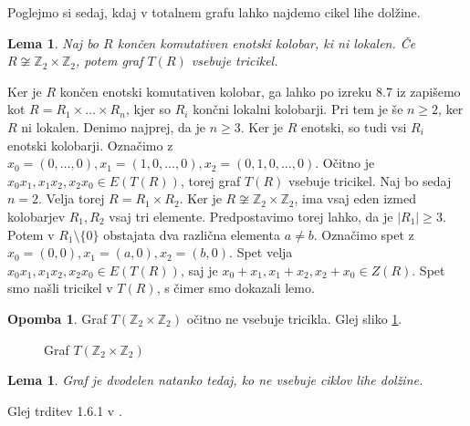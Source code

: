 \documentclass[a4paper, 12pt]{amsart}
\theoremstyle{definition} %
\newtheorem{opomba}[definicija]{Opomba}
\theoremstyle{plain} %
\newtheorem{lema}[definicija]{Lema}
\newcommand{\Z}{\mathbb Z}
\begin{document}
\endproof

Poglejmo si sedaj, kdaj v totalnem grafu lahko najdemo cikel lihe dolžine.

\begin{lema}
Naj bo $R$ končen komutativen enotski kolobar, ki ni lokalen. Če $R\not\cong \Z_2 \times \Z_2$, potem graf $T(R)$ vsebuje tricikel.
\end{lema}

\proof 
Ker je $R$ končen enotski komutativen kolobar, ga lahko po izreku 8.7 iz \cite{Atiyah} zapišemo kot $R=R_1 \times \dots\times R_n$, kjer so $R_i$ končni lokalni kolobarji. Pri tem je še $n\ge 2$, ker $R$ ni lokalen. Denimo najprej, da je $n\ge 3$. Ker je $R$ enotski, so tudi vsi $R_i$ enotski kolobarji. Označimo z $x_0 = (0,\dots,0), x_1 = (1,0,\dots,0), x_2 = (0,1,0,\dots,0)$. Očitno je $x_0 x_1, x_1 x_2, x_2 x_0 \in E(T(R))$, torej graf $T(R)$ vsebuje tricikel. Naj bo sedaj $n=2$. Velja torej $R= R_1 \times R_2$. Ker je $R\not \cong\Z_2 \times \Z_2$, ima vsaj eden izmed kolobarjev $R_1, R_2$ vsaj tri elemente. Predpostavimo torej lahko, da je $|R_1| \ge 3$. Potem v $R_1 \setminus\{0 \}$ obstajata dva različna elementa $a\neq b$. Označimo spet z $x_0 = (0,0), x_1 = (a,0), x_2 = (b,0)$. Spet velja $x_0 x_1, x_1 x_2, x_2 x_0 \in E(T(R))$, saj je $x_0 + x_1, x_1 + x_2, x_2 + x_0\in Z(R)$. Spet smo našli tricikel v $T(R)$, s čimer smo dokazali lemo.
\endproof

\begin{opomba}
Graf $T(\Z_2 \times \Z_2)$ očitno ne vsebuje tricikla. Glej sliko \ref{T(Z2xZ2)}.
\end{opomba}

\begin{figure}[h!]
\centering
{}
\caption{Graf $T(\Z_2 \times \Z_2)$}
\label{T(Z2xZ2)}
\end{figure}

\begin{lema}
Graf je dvodelen natanko tedaj, ko ne vsebuje ciklov lihe dolžine.
\end{lema}

\proof
Glej trditev 1.6.1 v \cite{Diestel}.
\endproof
\end{document}
